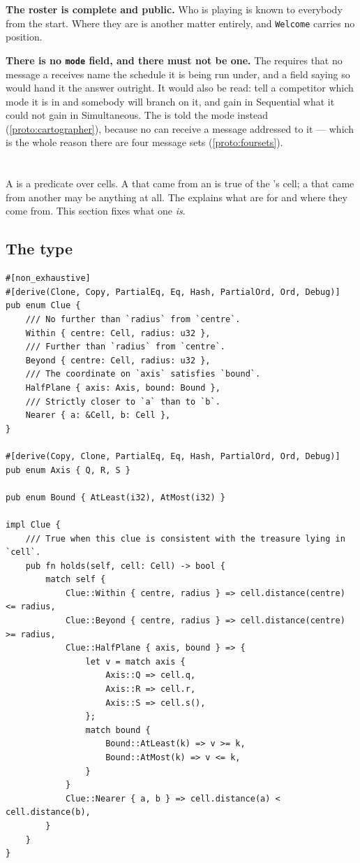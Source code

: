 \documentclass{article}
\begin{document}
\textbf{The roster is complete and public.} Who is playing is known to everybody from the start.
Where they are is another matter entirely, and \texttt{Welcome} carries no position.

\textbf{There is no \texttt{mode} field, and there must not be one.} The \MD{} requires that no
message a \ship{} receives name the schedule it is being run under, and a field saying so would
hand it the answer outright. It would also be read: tell a competitor which mode it is in
and somebody will branch on it, and gain in Sequential what it could not gain in Simultaneous.
The \cartographer{} is told the mode instead (\cref{proto:cartographer}), because no \ship{} can
receive a message addressed to it --- which is the whole reason there are four message sets
(\cref{proto:foursets}).

\newpage
\section{\clues{}}
\label{proto:clue}

A \clue{} is a predicate over cells. A \clue{} that came from an \island{} is true of the
\treasure{}'s cell; a \clue{} that came from another \ship{} may be anything at all. The \MD{}
explains what \clues{} are for and where they come from. This section fixes what one \emph{is}.

\subsection{The type}

\begin{lstlisting}
#[non_exhaustive]
#[derive(Clone, Copy, PartialEq, Eq, Hash, PartialOrd, Ord, Debug)]
pub enum Clue {
    /// No further than `radius` from `centre`.
    Within { centre: Cell, radius: u32 },
    /// Further than `radius` from `centre`.
    Beyond { centre: Cell, radius: u32 },
    /// The coordinate on `axis` satisfies `bound`.
    HalfPlane { axis: Axis, bound: Bound },
    /// Strictly closer to `a` than to `b`.
    Nearer { a: &Cell, b: Cell },
}

#[derive(Copy, Clone, PartialEq, Eq, Hash, PartialOrd, Ord, Debug)]
pub enum Axis { Q, R, S }

pub enum Bound { AtLeast(i32), AtMost(i32) }

impl Clue {
    /// True when this clue is consistent with the treasure lying in `cell`.
    pub fn holds(self, cell: Cell) -> bool {
        match self {
            Clue::Within { centre, radius } => cell.distance(centre) <= radius,
            Clue::Beyond { centre, radius } => cell.distance(centre) >= radius,
            Clue::HalfPlane { axis, bound } => {
                let v = match axis {
                    Axis::Q => cell.q,
                    Axis::R => cell.r,
                    Axis::S => cell.s(),
                };
                match bound {
                    Bound::AtLeast(k) => v >= k,
                    Bound::AtMost(k) => v <= k,
                }
            }
            Clue::Nearer { a, b } => cell.distance(a) < cell.distance(b),
        }
    }
}
\end{lstlisting}
\end{document}
